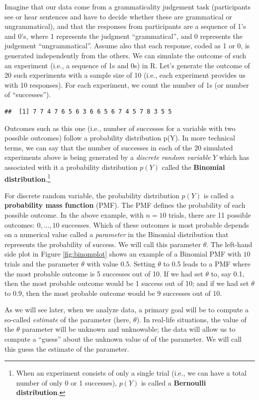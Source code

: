 \documentclass[12pt,]{krantz}
\begin{document}
Imagine that our data come from a grammaticality judgement task (participants see or hear sentences and have to decide whether these are grammatical or ungrammatical), and that the responses from participants are a sequence of 1's and 0's, where 1 represents the judgment ``grammatical'', and 0 represents the judgement ``ungrammatical''. Assume also that each response, coded as 1 or 0, is generated independently from the others. We can simulate the outcome of such an experiment (i.e., a sequence of 1s and 0s) in R. Let's generate the outcome of 20 such experiments with a sample size of 10 (i.e., each experiment provides us with 10 responses). For each experiment, we count the number of 1s (or number of ``successes'').

\begin{verbatim}
##  [1] 7 7 4 7 6 5 6 3 6 6 5 6 7 4 5 7 8 3 5 5
\end{verbatim}

Outcomes such as this one (i.e., number of successes for a variable with two possible outcomes) follow a probability distribution p(Y). In more technical terms, we can say that the number of successes in each of the \(20\) simulated experiments above is being generated by a \emph{discrete random variable} \(Y\) which has associated with it a probability distribution \(p(Y)\) called the \textbf{Binomial distribution}.\footnote{When an experiment consists of only a single trial (i.e., we can have a total number of only 0 or 1 successes), \(p(Y)\) is called a \textbf{Bernoulli distribution}.}

For discrete random variable, the probability distribution \(p(Y)\) is called a \textbf{probability mass function} (PMF). The PMF defines the probability of each possible outcome. In the above example, with \(n=10\) trials, there are 11 possible outcomes: \(0,\dots,10\) successes. Which of these outcomes is most probable depends on a numerical value called a \emph{parameter} in the Binomial distribution that represents the probability of success. We will call this parameter \(\theta\). The left-hand side plot in Figure \ref{fig:binomplot} shows an example of a Binomial PMF with \(10\) trials and the parameter \(\theta\) with value \(0.5\). Setting \(\theta\) to 0.5 leads to a PMF where the most probable outcome is 5 successes out of 10. If we had set \(\theta\) to, say 0.1, then the most probable outcome would be 1 success out of 10; and if we had set \(\theta\) to 0.9, then the most probable outcome would be 9 successes out of 10.

As we will see later, when we analyze data, a primary goal will be to compute a so-called \emph{estimate} of the parameter (here, \(\theta\)). In real-life situations, the value of the \(\theta\) parameter will be unknown and unknowable; the data will allow us to compute a ``guess'' about the unknown value of of the parameter. We will call this guess the estimate of the parameter.
\end{document}
